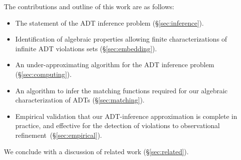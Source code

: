 The contributions and outline of this work are as follows:
\begin{itemize}

  \item The statement of the ADT inference problem (§\ref{sec:inference}).

  \item Identification of algebraic properties allowing finite
  characterizations of infinite ADT violations sets (§\ref{sec:embedding}).

  \item An under-approximating algorithm for the ADT inference problem
  (§\ref{sec:computing}).

  \item An algorithm to infer the matching functions required for our algebraic
  characterization of ADTs (§\ref{sec:matching}).

  \item Empirical validation that our ADT-inference approximation is complete
  in practice, and effective for the detection of violations to observational
  refinement~(§\ref{sec:empirical}).

\end{itemize}
We conclude with a discussion of related work (§\ref{sec:related}).
